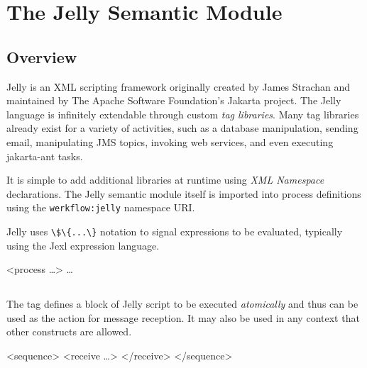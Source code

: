 \chapter{The Jelly Semantic Module}

\section{Overview}

Jelly is an XML scripting framework originally created by
James Strachan and maintained by The Apache Software Foundation's
Jakarta project.  The Jelly language is infinitely extendable
through custom \emph{tag libraries}.  Many tag libraries
already exist for a variety of activities, such as a database
manipulation, sending email, manipulating JMS topics, invoking
web services, and even executing jakarta-ant tasks.

It is simple to add additional libraries at runtime using
\emph{XML Namespace} declarations.  The Jelly semantic
module itself is imported into process definitions using
the \verb|werkflow:jelly| namespace URI.

Jelly uses \verb|\$\{...\}| notation to signal expressions
to be evaluated, typically using the Jexl expression language.

\begin{codelisting}
<process  \dots>
    \dots
\end{codelisting}


\section{}

The  tag defines a block of Jelly script
to be executed \emph{atomically} and thus can be used
as the action for message reception.  It may also be used
in any context that other constructs are allowed.

\begin{codelisting}
<sequence>
    <receive \dots>
    </receive>
</sequence>
\end{codelisting}


